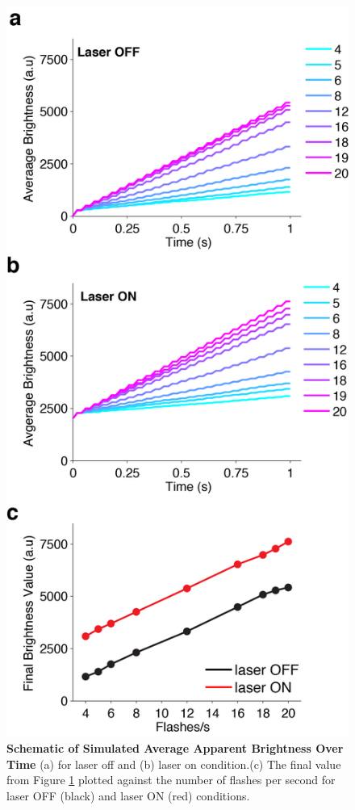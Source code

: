 \begin{figure}
  \centering
   \includegraphics[width=\textwidth,height=0.9\textheight,keepaspectratio]{Figures/chapter4/brightnes_simulation_opto.png}
  \caption[Schematic of Simulated Average Apparent Brightness Over Time]{\textbf{Schematic of Simulated Average Apparent Brightness Over Time} (a) for laser off and (b) laser on condition.(c) The final value from Figure \ref{fig:brightnessSim} plotted against the number of flashes per second for laser OFF (black) and laser ON (red) conditions.}
   \label{fig:brightnessSim}
\end{figure}

